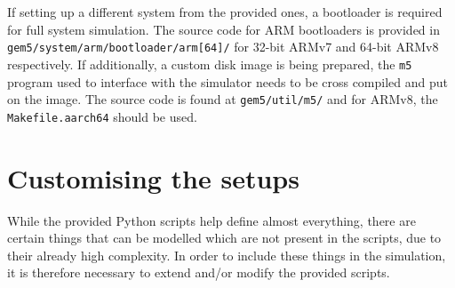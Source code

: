 If setting up a different system from the provided ones, a bootloader is
required for full system simulation. The source code for ARM bootloaders is 
provided in \texttt{gem5/system/arm/bootloader/arm[64]/} for 32-bit ARMv7 and 
64-bit ARMv8 respectively. If additionally, a custom disk image is being 
prepared, the \texttt{m5} program used to interface with the simulator needs to 
be cross compiled and put on the image. The source code is found at 
\texttt{gem5/util/m5/} and for ARMv8, the \texttt{Makefile.aarch64} should be 
used.
    
\section{Customising the setups}
While the provided Python scripts help define almost everything, there are 
certain things that can be modelled which are not present in the scripts, due to
their already high complexity. In order to include these things in the 
simulation, it is therefore necessary to extend and/or modify the provided 
scripts.

